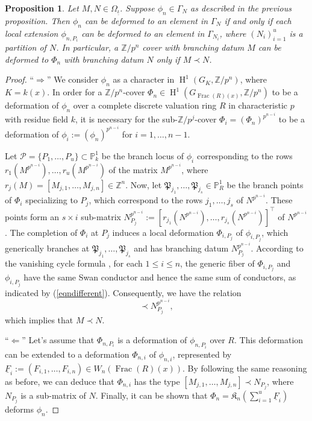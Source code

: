 \documentclass{compositio}
\newtheorem{proposition}[theorem]{Proposition}
\theoremstyle{remark}
\theoremstyle{remark}
\DeclareMathOperator{\Frac}{Frac}
\DeclareMathOperator{\cohom}{H}
\begin{document}
\begin{proposition}
\label{proplocaltoglobal}
Let $M,N \in \Omega_{\underline{\iota}}$. Suppose $\phi_n \in \Gamma_N$ as described in the previous proposition. Then $\phi_n$ can be deformed to an element in $\Gamma_N$ if and only if each local extension $\phi_{n,P_i}$ can be deformed to an element in $\Gamma_{N_i}$, where $(N_i)_{i=1}^u$ is a partition of $N$. In particular, a $\mathbb{Z}/p^n$ cover with branching datum $M$ can be deformed to $\Phi_n$ with branching datum $N$ only if $M \prec N$.
\end{proposition}

\begin{proof}
``$\Rightarrow$'' We consider $\phi_n$ as a character in $\cohom^1(G_K, \mathbb{Z}/p^n)$, where $K=k(x)$. In order for a $\mathbb{Z}/p^n$-cover $\Phi_n \in \cohom^1(G_{\Frac(R)(x)}, \mathbb{Z}/p^n)$ to be a deformation of $\phi_n$ over a complete discrete valuation ring $R$ in characteristic $p$ with residue field $k$, it is necessary for the sub-$\mathbb{Z}/p^j$-cover $\Phi_i=(\Phi_n)^{p^{n-i}}$ to be a deformation of $\phi_i:=(\phi_n)^{p^{n-i}}$ for $i=1, \ldots, n-1$.

Let $\mathscr{P}=\{ P_1, \ldots, P_u \} \subset \mathbb{P}^1_k$ be the branch locus of $\phi_i$ corresponding to the rows $r_1(M^{p^{n-i}}), \ldots, \allowbreak r_u(M^{p^{n-i}})$ of the matrix $M^{p^{n-i}}$, where $r_j(M)=[M_{j,1},\ldots, M_{j,n}]\in \mathbb{Z}^n$. Now, let $\mathfrak{P}_{j_1}, \ldots, \mathfrak{P}_{j_s} \in \mathbb{P}^1_R$ be the branch points of $\Phi_i$ specializing to $P_j$, which correspond to the rows $j_1, \ldots, j_s$ of $N^{p^{n-i}}$. These points form an $s \times i$ sub-matrix $N_{P_j}^{p^{n-i}}:=[r_{j_1}(N^{p^{n-i}}), \ldots, \allowbreak r_{j_s}(N^{p^{n-i}})]^{\intercal}$ of $N^{p^{n-i}}$. The completion of $\Phi_i$ at $P_j$ induces a local deformation $\Phi_{i, P_j}$ of $\phi_{i,P_j}$, which generically branches at $\mathfrak{P}_{j_1}, \ldots, \mathfrak{P}_{j_s}$ and has branching datum $N^{p^{n-i}}_{P_j}$. According to the vanishing cycle formula \cite{MR904945}, for each $1 \leq i \leq n$, the generic fiber of $\Phi_{i,P_j}$ and $\phi_{i,P_j}$ have the same Swan conductor and hence the same sum of conductors, as indicated by (\ref{eqndifferent}). Consequently, we have the relation
\begin{equation*}
[M_{j,1},\ldots, M_{j,i}] \prec N^{p^{n-i}}_{P_j},
\end{equation*}
which implies that $M \prec N$.

``$\Leftarrow$'' Let's assume that $\Phi_{n,P_i}$ is a deformation of $\phi_{n,P_i}$ over $R$. This deformation can be extended to a deformation $\Phi_{n,i}$ of $\phi_{n,i}$, represented by $\underline{F}_i:=(F_{i,1}, \ldots, F_{i,n}) \in W_n(\Frac(R)(x))$. By following the same reasoning as before, we can deduce that $\Phi_{n,i}$ has the type $[M_{j,1},\ldots, M_{j,n}] \prec N_{P_j}$, where $N_{P_j}$ is a sub-matrix of $N$. Finally, it can be shown that $\Phi_n=\mathfrak{K}_n(\sum_{i=1}^u \underline{F}_{i})$ deforms $\phi_n$.
\end{proof}
\end{document}
